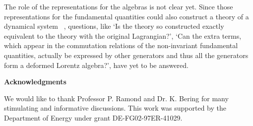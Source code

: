 \documentclass[a4paper,a4paper]{article}
\begin{document}
The role of the representations for the algebras is not clear yet. 
Since those representations for the fundamental quantities
could also construct a theory of a dynamical system~\cite{Dirac}
, questions, like `Is the theory so constructed exactly equivalent to the 
theory with the original Lagrangian?', `Can the extra terms, which appear in the 
commutation relations of the non-invariant fundamental quantities, 
actually be expressed by other generators and thus all the generators form 
a deformed Lorentz algebra?', have yet to be answered. 

\vskip 1cm
\centerline{\bf Acknowledgments}
We would like to thank Professor P. Ramond and Dr. K. Bering for many stimulating and 
informative discussions. This work was supported by the Department of Energy 
under grant DE-FG02-97ER-41029.
\end{document}
